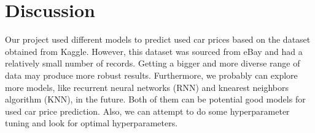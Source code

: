 \documentclass[UTF8]{ctexart}
\begin{document}
    \section{Discussion}
    Our project used different models to predict used car prices based on the dataset obtained from Kaggle. However, this dataset was sourced from eBay and had a relatively small number of records. Getting a bigger and more diverse range of data may produce more robust results.
    \newline
    Furthermore, we probably can explore more models, like recurrent neural networks (RNN) and knearest neighbors algorithm (KNN), in the future. Both of them can be potential good models for used car price prediction.
    \newline
    Also, we can attempt to do some hyperparameter tuning and look for optimal hyperparameters.
    \newline
    
\end{document}
